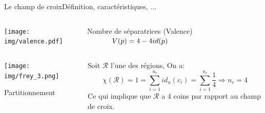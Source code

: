     \begin{frame}{Le champ de croix}{Définition, caractéristiques, ...}
    \begin{columns}
        \begin{column}{0.6\textwidth}
            \centering
            \texttt{[image: img/valence.pdf]}\\\vspace{0.3cm}
        \end{column}
        \begin{column}{0.4\textwidth}
            \begin{onerablock}{\small Nombre de séparatrices (Valence)}
            \vspace{0.5cm}
            $
            \hspace{1.2cm}
            V(p)=4-4id(p)
            \hspace{1.2cm}
            $
            \vspace{0.5cm}
            \end{onerablock}
        \end{column}
    \end{columns}
    \begin{columns}
        \begin{column}{0.4\textwidth}
            \centering
            \texttt{[image: img/frey\_3.png]}\\\vspace{0.15cm}
            \caption{\footnotesize Partitionnement}
        \end{column}
        \begin{column}{0.6\textwidth}
            Soit $\mathcal{R}$ l'une des régions, On a:
    $$\chi(\mathcal{R})=1=\sum_{i=1}^{n_c}id_u(c_i)=\sum_{i=1}^{n_c}\frac{1}{4}\Longrightarrow n_c=4$$
    Ce qui implique que $\mathcal{R}$ a 4 coins par rapport au champ de croix.
        \end{column}
    \end{columns}
\end{frame}

